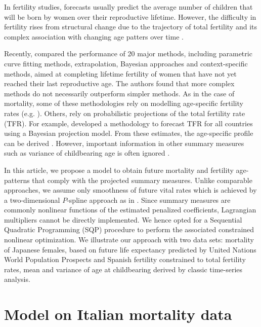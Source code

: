 \documentclass[a4paper,twoside, openright, 12pt, leqno]{article}
\begin{document}
In fertility studies, forecasts usually predict the average number of children that will be born by women over their reproductive lifetime. However, the difficulty in fertility rises from structural change due to the trajectory of total fertility and its complex association with changing age patters over time \citep{Booth2006}. 


Recently, \citet{bohk2018forecast} compared the performance of 20 major methods, including parametric curve fitting methods, extrapolation, Bayesian approaches and context-specific methods, aimed at completing lifetime fertility of women that have not yet reached their last reproductive age. The authors found that more complex methods do not necessarily outperform simpler methods. As in the case of mortality, some of these methodologies rely on modelling age-specific fertility rates (e.g. \citet{coale1974model,chandola1999recent,schmertmann2003system,peristera2007modeling,hyndman2008stochastic}). Others, rely on probabilistic projections of the total fertility rate (TFR). For example, \citet{alkema2011probabilistic} developed a methodology to forecast TFR for all countries using a Bayesian projection model. From these estimates, the age-specific profile can be derived \citep{vsevvcikova2016age}. However, important information in other summary measures such as variance of childbearing age is often ignored \citep{hruschka2016does}.

In this article, we propose a model to obtain future mortality and fertility age-patterns that comply with the projected summary measures. Unlike comparable approaches, we assume only smoothness of future vital rates which is achieved by a two-dimensional $P$-spline approach as in \citet{currie2004smoothing}. Since summary measures are commonly nonlinear functions of the estimated penalized coefficients, Lagrangian multipliers cannot be directly implemented. We hence opted for a Sequential Quadratic Programming (SQP) procedure \citep{nocedal2006sequential} to perform the associated constrained nonlinear optimization. We illustrate our approach with two data sets: mortality of Japanese females, based on future life expectancy predicted by United Nations World Population Prospects \citep{UN2017} and Spanish fertility constrained to total fertility rates, mean and variance of age at childbearing derived by classic time-series analysis.


\section{Model on Italian mortality data}
\end{document}
